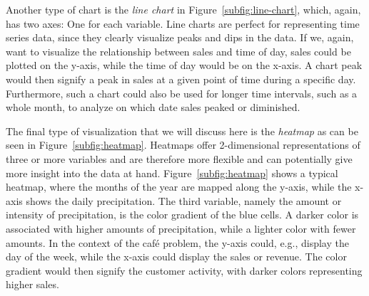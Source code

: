 Another type of chart is the \textit{line chart} in Figure~\ref{subfig:line-chart}, which, again, has two axes: One for
each variable.
Line charts are perfect for representing time series data, since they clearly visualize peaks and dips in the data.
If we, again, want to visualize the relationship between sales and time of day, sales could be plotted on the y-axis,
while the time of day would be on the x-axis.
A chart peak would then signify a peak in sales at a given point of time during a specific day.
Furthermore, such a chart could also be used for longer time intervals, such as a whole month, to analyze on which date
sales peaked or diminished.

The final type of visualization that we will discuss here is the \textit{heatmap} as can be seen in
Figure~\ref{subfig:heatmap}.
Heatmaps offer 2-dimensional representations of three or more variables and are therefore more flexible and can
potentially give more insight into the data at hand.
Figure~\ref{subfig:heatmap} shows a typical heatmap, where the months of the year are mapped along the y-axis, while the
x-axis shows the daily precipitation.
The third variable, namely the amount or intensity of precipitation, is the color gradient of the blue cells.
A darker color is associated with higher amounts of precipitation, while a lighter color with fewer amounts.
In the context of the café problem, the y-axis could, e.g., display the day of the week, while the x-axis could display
the sales or revenue.
The color gradient would then signify the customer activity, with darker colors representing higher sales.

